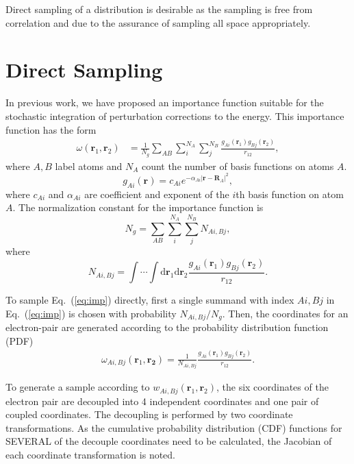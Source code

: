\documentclass{revtex4}
\begin{document}
Direct sampling of a distribution is desirable as the sampling is free from correlation and due to the assurance of sampling all space appropriately.

\section{Direct Sampling}
  In previous work, we have proposed an importance function suitable for the stochastic integration of perturbation corrections to the energy.
  This importance function has the form
  \begin{align}
    \omega(\mathbf{r}_1, \mathbf{r}_2)
    &= \frac{1}{N_g}\sum_{AB}\sum_{i}^{N_A}\sum_j^{N_B}\frac{g_{Ai}(\mathbf{r}_1)g_{Bj}(\mathbf{r}_2)}{r_{12}},
    \label{eq:imp}
  \end{align}
  where $A, B$ label atoms and $N_A$ count the number of basis functions on atoms $A$.
  \begin{equation}
    g_{Ai}(\mathbf{r}) = c_{Ai} e^{-\alpha_{Ai}|\mathbf{r}-\mathbf{R}_A|^2},
  \end{equation}
  where $c_{Ai}$ and $\alpha_{Ai}$ are coefficient and exponent of the $i$th basis function on atom $A$.
  The normalization constant for the importance function is
  \begin{equation}
    N_g = \sum_{AB}\sum_{i}^{N_A}\sum_j^{N_B} N_{Ai,Bj},
  \end{equation}
  where 
  \begin{equation}
     N_{Ai,Bj} = \int \cdots \int \mathrm{d}\mathbf{r}_1 \mathrm{d}\mathbf{r}_2 \frac{g_{Ai}(\mathbf{r}_1)g_{Bj}(\mathbf{r}_2)}{r_{12}}.
    \label{eq:impTerm}
  \end{equation}

  To sample Eq.\ (\ref{eq:imp}) directly, first a single summand with index $Ai, Bj$ in Eq.\ (\ref{eq:imp}) is chosen with probability $N_{Ai,Bj}/N_g$.
  Then, the coordinates for an electron-pair are generated according to the probability distribution function (PDF)
  \begin{align}
     \omega_{Ai,Bj}(\mathbf{r}_1, \mathbf{r_2}) = \frac{1}{N_{Ai, Bj}} \frac{g_{Ai}(\mathbf{r}_1)g_{Bj}(\mathbf{r}_2)}{r_{12}}.
     \label{eq:sgl_imp_t0}
  \end{align}

  To generate a sample according to $w_{Ai,Bj}(\mathbf{r}_1, \mathbf{r}_2)$, the six coordinates of the electron pair are decoupled into 4 independent coordinates and one pair of coupled
  coordinates. The decoupling is performed by two coordinate transformations.
  As the cumulative probability distribution (CDF) functions for SEVERAL of the decouple coordinates need to be calculated, the Jacobian of each coordinate transformation is noted.
  
\end{document}
